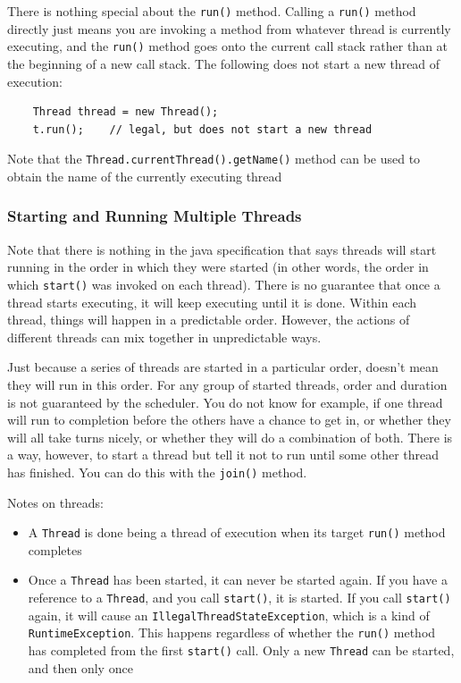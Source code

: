 There is nothing special about the \verb#run()# method. Calling a \verb#run()# 
method directly just means you are invoking a method from whatever thread is 
currently executing, and the \verb#run()# method goes onto the current call 
stack rather than at the beginning of a new call stack. The following does not 
start a new thread of execution:
\begin{verbatim}
    Thread thread = new Thread();
    t.run();    // legal, but does not start a new thread
\end{verbatim}

Note that the \verb#Thread.currentThread().getName()# method can be used to obtain the name of the currently executing thread

\subsubsection{Starting and Running Multiple Threads}
Note that there is nothing in the java specification that says threads will start running in the order in which they were started (in other words, the order in which \verb#start()# was invoked on each thread). There is no guarantee that once a thread starts executing, it will keep executing until it is done. Within each thread, things will happen in a predictable order. However, the actions of different threads can mix together in unpredictable ways.

Just because a series of threads are started in a particular order, doesn't mean they will run in this order. For any group of started threads, order and duration is not guaranteed by the scheduler. You do not know for example, if one thread will run to completion before the others have a chance to get in, or whether they will all take turns nicely, or whether they will do a combination of both. There is a way, however, to start a thread but tell it not to run until some other thread has finished. You can do this with the \verb#join()# method.

Notes on threads:
\begin{itemize}
    \item A \verb#Thread# is done being a thread of execution when its target \verb#run()# method completes
    \item Once a \verb#Thread# has been started, it can never be started again. If you have a reference to a \verb#Thread#, and you call \verb#start()#, it is started. If you call \verb#start()# again, it will cause an \verb#IllegalThreadStateException#, which is a kind of \verb#RuntimeException#. This happens regardless of whether the \verb#run()# method has completed from the first \verb#start()# call. Only a new \verb#Thread# can be started, and then only once
\end{itemize}

